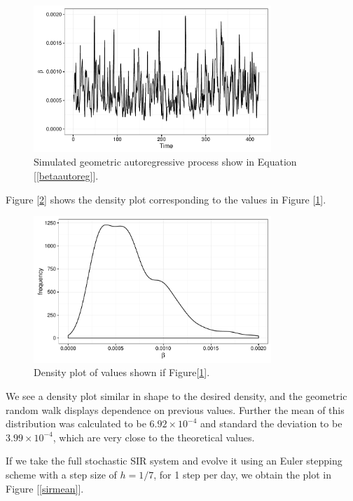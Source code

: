 	\begin{figure}
        \centering
        \captionsetup{width=.8\linewidth}
        \includegraphics[width=0.8\textwidth]{./images/betaplot.pdf}
        \caption{Simulated geometric autoregressive process show in Equation [\ref{betaautoreg}]. \label{betaplot}}
    \end{figure}

    Figure [\ref{betadensity}] shows the density plot corresponding to the values in Figure [\ref{betaplot}].

    \begin{figure}
        \centering
        \captionsetup{width=.8\linewidth}
        \includegraphics[width=0.8\textwidth]{./images/betadensity.pdf}
        \caption{Density plot of values shown if Figure[\ref{betaplot}]. \label{betadensity}}
    \end{figure}

    We see a density plot similar in shape to the desired density, and the geometric random walk displays dependence on previous values. Further the mean of this distribution was calculated to be $6.92 \times 10^{-4}$ and standard the deviation to be $3.99 \times 10^{-4}$, which are very close to the theoretical values.

    If we take the full stochastic SIR system and evolve it using an Euler stepping scheme with a step size of $h = 1/7$, for 1 step per day, we obtain the plot in Figure [\ref{sirmean}].

